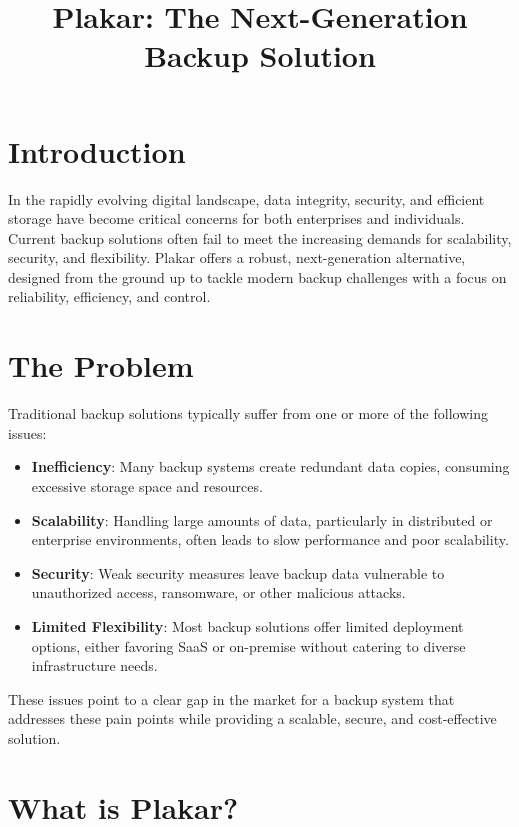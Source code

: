 \documentclass{article}
\title{Plakar: The Next-Generation Backup Solution}
\author{}
\date{}
\begin{document}
\maketitle

\section*{Introduction}

In the rapidly evolving digital landscape, data integrity, security, and efficient storage have become critical concerns for both enterprises and individuals. Current backup solutions often fail to meet the increasing demands for scalability, security, and flexibility. Plakar offers a robust, next-generation alternative, designed from the ground up to tackle modern backup challenges with a focus on reliability, efficiency, and control.

\section*{The Problem}

Traditional backup solutions typically suffer from one or more of the following issues:
\begin{itemize}
    \item \textbf{Inefficiency}: Many backup systems create redundant data copies, consuming excessive storage space and resources.
    \item \textbf{Scalability}: Handling large amounts of data, particularly in distributed or enterprise environments, often leads to slow performance and poor scalability.
    \item \textbf{Security}: Weak security measures leave backup data vulnerable to unauthorized access, ransomware, or other malicious attacks.
    \item \textbf{Limited Flexibility}: Most backup solutions offer limited deployment options, either favoring SaaS or on-premise without catering to diverse infrastructure needs.
\end{itemize}

These issues point to a clear gap in the market for a backup system that addresses these pain points while providing a scalable, secure, and cost-effective solution.

\section*{What is Plakar?}
\end{document}
